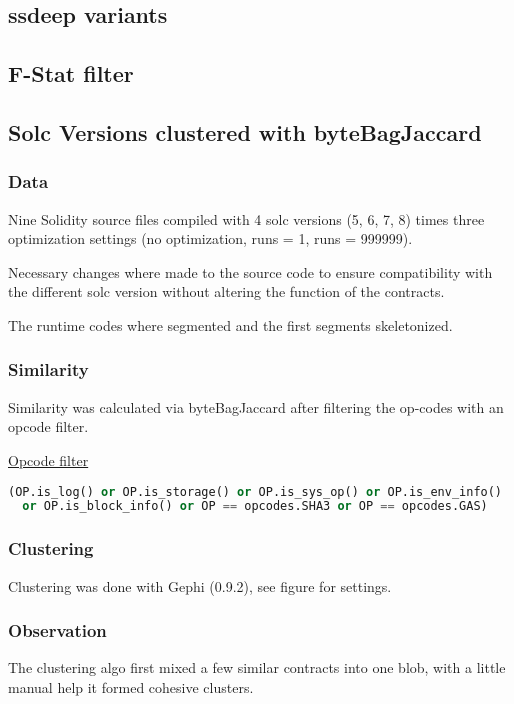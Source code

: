 \documentclass[../main.tex]{subfiles}
\begin{document}

\subsection{ssdeep variants}

\subsection{F-Stat filter}


\subsection{Solc Versions clustered with byteBagJaccard}

\subsubsection{Data}

Nine Solidity source files compiled with 4 solc versions (5, 6, 7, 8) times three optimization
settings (no optimization, runs = 1, runs = 999999).

Necessary changes where made to the source code to ensure compatibility with the different solc
version without altering the function of the contracts.

The runtime codes where segmented and the first segments skeletonized.

\subsubsection{Similarity}
Similarity was calculated via byteBagJaccard after filtering the op-codes with an opcode filter.

\underline{Opcode filter}
\begin{lstlisting}[style=mystyle,language=Python]
(OP.is_log() or OP.is_storage() or OP.is_sys_op() or OP.is_env_info()
  or OP.is_block_info() or OP == opcodes.SHA3 or OP == opcodes.GAS)
\end{lstlisting}

\subsubsection{Clustering}
Clustering was done with Gephi (0.9.2), see figure for settings.

\subsubsection{Observation}
The clustering algo first mixed a few similar contracts into one blob, with a little manual help
it formed cohesive clusters.
\end{document}

